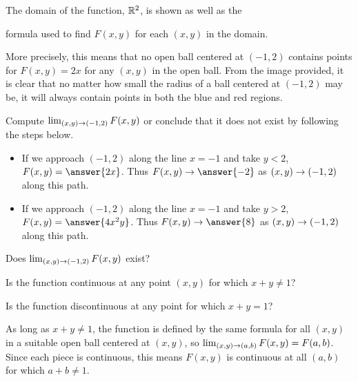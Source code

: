 \documentclass{ximera}
\begin{document}
\begin{exercise}
\begin{exercise}
\begin{feedback}[correct]
\begin{image}
\end{image}
\begin{center}
The domain of the function, $\mathbb R^2$, is shown as well as the 

formula used to find $F(x,y)$ for each $(x,y)$ in the domain.
\end{center}

More precisely, this means that no open ball centered at $(-1,2)$ contains points for $F(x,y) = 2x$ for any $(x,y)$ in the open ball. From the image provided, it is clear that no matter how small the radius of a ball centered at $(-1,2)$ may be, it will always contain points in both the blue and red regions.
\end{feedback}

\begin{exercise}
Compute $\lim_{\left(x,y\right) \to \left(-1,2\right)} F(x,y)$ or conclude that it does not exist by following the steps below.

\begin{itemize}
\item If we approach $(-1,2)$ along the line $x=-1$ and take $y<2$, $F(x,y) = \answer{2x}$.  Thus $F(x,y) \to \answer{-2}$ as $\left(x,y\right) \to \left(-1,2\right)$ along this path.
\item If we approach $(-1,2)$ along the line $x=-1$ and take $y>2$, $F(x,y) = \answer{4x^2y}$.  Thus $F(x,y) \to \answer{8}$ as $\left(x,y\right) \to \left(-1,2\right)$ along this path.
\end{itemize}

Does $\lim_{\left(x,y\right) \to \left(-1,2\right)} F(x,y)$ exist? 
\end{exercise}
\end{exercise}

\begin{exercise}
Is the function continuous at any point $(x,y)$ for which $x+y \neq 1$? 

Is the function discontinuous at any point for which $x+y =1$? 

\begin{feedback}[correct]
As long as $x+y \neq 1$, the function is defined by the same formula for all $(x,y)$ in a suitable open ball centered at $(x,y)$, so $\lim_{\left(x,y\right) \to \left(a,b\right)}F(x,y) = F(a,b)$.  Since each piece is continuous, this means $F(x,y)$ is continuous at all $(a,b)$ for which $a+b \neq 1$.


\end{feedback}
\end{exercise}
\end{exercise}
\end{document}
